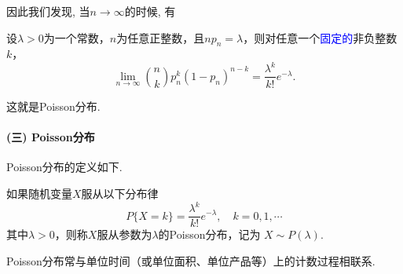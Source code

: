 因此我们发现, 当$n\to\infty$的时候, 有
\begin{theorem}
    设$\lambda>0$为一个常数，$n$为任意正整数，且$np_n=\lambda$，则对任意一个\textcolor{blue}{固定的}非负整数$k$，
    $$
        \lim_{n\rightarrow \infty}{n\choose k}p_n^k(1-p_n)^{n-k}=\frac{\lambda^k}{k!}e^{-\lambda}.
    $$
\end{theorem}
这就是Poisson分布.

\paragraph{(三) Poisson分布}

Poisson分布的定义如下.
\begin{definition}[Poisson分布]
    如果随机变量$X$服从以下分布律
    \[ P\{X=k\}=\frac{\lambda^k}{k!}e^{-\lambda},\quad k=0,1,\cdots \]
    其中$\lambda>0$，则称$X$服从参数为$\lambda$的Poisson分布，记为
    $X\sim P(\lambda).$
\end{definition}%
Poisson分布常与单位时间（或单位面积、单位产品等）上的计数过程相联系.